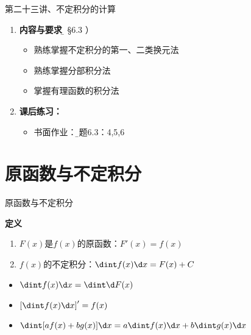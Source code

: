 \begin{frame}{第二十三讲、不定积分的计算}
	\linespread{1.5}
	\begin{enumerate}
	  \item {\bf 内容与要求}{\b（ \S 6.3 ）}
	  \begin{itemize}
	    \item 熟练掌握不定积分的第一、二类换元法
	    \item 熟练掌握分部积分法
	    \item 掌握有理函数的积分法
	  \vspace{1em}
	  \end{itemize}
	  \item {\bf 课后练习：}
	  \begin{itemize}
	    \item 书面作业：{\b 习题6.3：4,5,6}
	  \end{itemize}
	\end{enumerate}
\end{frame}

\section{原函数与不定积分}

\begin{frame}{原函数与不定积分}
	\linespread{1.2}\pause 
	\begin{block}{{\bf 定义}\hfill}
		\begin{enumerate}\pause 
		  \item $F(x)$是$f(x)$的{\bb 原函数}：\pause $F'(x)=f(x)$\pause 
		  \item $f(x)$的{\bb 不定积分}：\pause $\dint f(x)\d x=F(x)+C$\pause 
		\end{enumerate}
	\end{block}
	\begin{itemize}
	  \item $\dint f(x)\d x=\dint \d F(x)$\pause 
	  \item $\left[\dint f(x)\d x\right]'=f(x)$\pause 
	  \item $\dint [af(x)+bg(x)]\d x=a\dint f(x)\d x+b\dint g(x)\d x$
	\end{itemize}
\end{frame}

